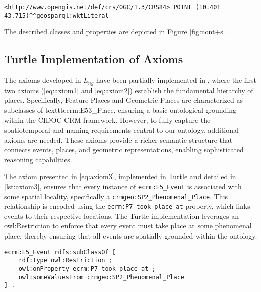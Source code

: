 \begin{lstlisting}[caption=A point in WKT, label={lst:point-wkt}]
<http://www.opengis.net/def/crs/OGC/1.3/CRS84> POINT (10.401 43.715)^^geosparql:wktLiteral
\end{lstlisting}

The described classes and properties are depicted in Figure \ref{fig:nont+s}.

\subsection{Turtle Implementation of Axioms}\label{V-subsec:turtle-implementation-axioms}

The axioms developed in \( L_{ng} \) have been partially implemented in , where the first two axioms (\ref{eq:axiom1} and \ref{eq:axiom2}) establish the fundamental hierarchy of places. Specifically, Feature Places and Geometric Places are characterized as subclasses of texttt{ecrm:E53\_Place}, ensuring a basic ontological grounding within the CIDOC CRM framework. However, to fully capture the spatiotemporal and naming requirements central to our ontology, additional axioms are needed. These axioms provide a richer semantic structure that connects events, places, and geometric representations, enabling sophisticated reasoning capabilities.

The axiom presented in \ref{eq:axiom3}, implemented in Turtle and detailed in \ref{lst:axiom3}, ensures that every instance of \texttt{ecrm:E5\_Event} is associated with some spatial locality, specifically a \texttt{crmgeo:SP2\_Phenomenal\_Place}. This relationship is encoded using the \texttt{ecrm:P7\_took\_place\_at} property, which links events to their respective locations. The Turtle implementation leverages an owl:Restriction to enforce that every event must take place at some phenomenal place, thereby ensuring that all events are spatially grounded within the ontology.

\begin{lstlisting}[caption=Axiom \ref{eq:axiom3} in  in NOnt+S, label={lst:axiom3}]
ecrm:E5_Event rdfs:subClassOf [ 
    rdf:type owl:Restriction ;
    owl:onProperty ecrm:P7_took_place_at ;
    owl:someValuesFrom crmgeo:SP2_Phenomenal_Place
] .
\end{lstlisting}

